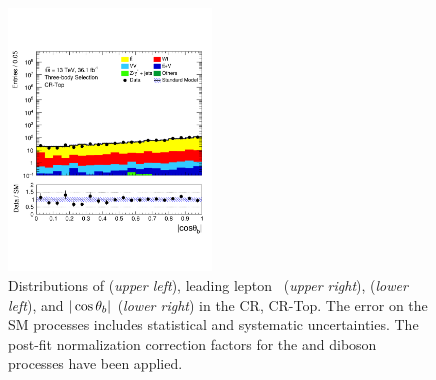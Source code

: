\begin{figure}[!htb]
\begin{center}
        \includegraphics[width=0.48\textwidth]{figures/search_stop2l/bkg_est/crtop/crt_cosThetaB}
        \caption{
            Distributions of \mdr (\textit{upper left}), leading lepton \pT~(\textit{upper right}),
            \dpb (\textit{lower left}), and $|\cos\theta_b|$ (\textit{lower right}) in the \ttbar CR,
            CR-Top.
            The error on the SM processes includes statistical and systematic uncertainties.
            The post-fit normalization correction factors for the \ttbar and diboson processes
            have been applied.
        }
        \label{fig:crt_0}
    \end{center}
\end{figure}
